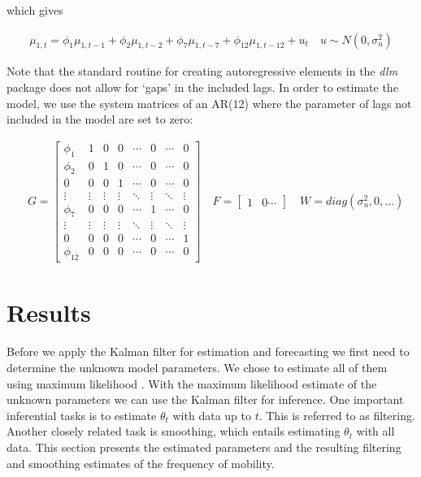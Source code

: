 \documentclass[12pt, a4paper]{article}
\begin{document}
which gives

\begin{align}
\mu_{1,t} = \phi_{1} \mu_{1,t-1} + \phi_{2} \mu_{1,t-2} + \phi_{7} \mu_{1,t-7} + \phi_{12} \mu_{1,t-12} + u_{t} \quad u \sim N(0, \sigma^{2}_{u})
\end{align}

Note that the standard routine for creating autoregressive elements in
the \emph{dlm} package does not allow for `gaps' in the included lags. In
order to estimate the model, we use the system matrices of
an AR(12) where the parameter of lags not included in the model are set
to zero:

\begin{align*}
& G = \begin{bmatrix} 
\phi_{1}  & 1      & 0      & 0      & \cdots & 0      & \cdots & 0      \\
\phi_{2}  & 0      & 1      & 0      & \cdots & 0      & \cdots & 0      \\
0         & 0      & 0      & 1      & \cdots & 0      & \cdots & 0      \\
\vdots    & \vdots & \vdots & \vdots & \ddots & \vdots & \ddots & \vdots \\
\phi_{7}  & 0      & 0      & 0      & \cdots & 1      & \cdots & 0      \\
\vdots    & \vdots & \vdots & \vdots & \ddots & \vdots & \ddots & \vdots \\
0         & 0      & 0      & 0      & \cdots & 0      & \cdots & 1      \\
\phi_{12} & 0      & 0      & 0      & \cdots & 0      & \cdots & 0
\end{bmatrix} \quad F = \begin{bmatrix} 1 & 0 \cdots \end{bmatrix} \quad W = diag(\sigma_{u}^{2}, 0, ...)
\end{align*}


\section{Results}\label{results}

Before we apply the Kalman filter for estimation and forecasting we first need to determine the
unknown model parameters. We chose to estimate all of them using maximum
likelihood \citep[see][ch.~4]{petris2009dynamic}. With the maximum likelihood estimate of the unknown parameters we can use the Kalman filter for inference. One important inferential tasks is to estimate $\theta_{t}$ with data up to $t$. This is referred to as filtering. Another closely related task is smoothing, which entails estimating $\theta_{t}$ with all data. This section presents the estimated parameters and the resulting filtering and smoothing estimates of the frequency of mobility.
\end{document}
